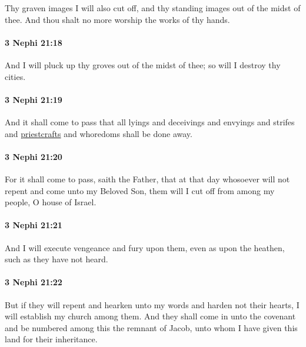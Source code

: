 			Thy graven images I will also cut off,
			and thy standing images out of the midst of thee.
			And thou shalt no more worship the works of thy hands.

		\paragraph{3 Nephi 21:18} %
			\label{3NEPHI-21-18}

			And I will pluck up thy groves out of the midst of thee;
			so will I destroy thy cities.

		\paragraph{3 Nephi 21:19} %
			\label{3NEPHI-21-19}

			And it shall come to pass that all lyings and deceivings
			and envyings and strifes and \hyperref[PRIESTCRAFT]{priestcrafts} and whoredoms shall be done away.

		\paragraph{3 Nephi 21:20} %
			\label{3NEPHI-21-20}

			For it shall come to pass, saith the Father,
			that at that day whosoever will not repent and come unto my Beloved Son,
			them will I cut off from among my people, O house of Israel.

		\paragraph{3 Nephi 21:21} %
			\label{3NEPHI-21-21}

			And I will execute vengeance and fury upon them,
			even as upon the heathen, such as they have not heard.

		\paragraph{3 Nephi 21:22} %
			\label{3NEPHI-21-22}

			But if they will repent and hearken unto my words
			and harden not their hearts,
			I will establish my church among them.
			And they shall come in unto the covenant
			and be numbered among this the remnant of Jacob,
			unto whom I have given this land for their inheritance.

